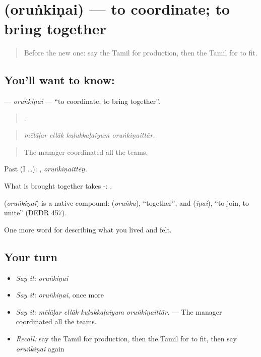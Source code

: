 \section[\texorpdfstring{\ta{ஒருங்கிணை} (oruṅkiṇai)}{ஒருங்கிணை (oruṅkiṇai)}]{ (oruṅkiṇai) — to coordinate; to bring together}

\label{lesson:TA-C510-orunkinai}



\begin{quote}
Before the new one: say the Tamil for production, then the Tamil for to fit.
\end{quote}

\subsection*{You'll want to know: }
\textbf{} — \emph{oruṅkiṇai} — \textquotedblleft{}to coordinate; to bring together\textquotedblright{}.

\begin{quote}
   .
\end{quote}

\begin{quote}
\emph{mēlāḷar ellāk kuḻukkaḷaiyum oruṅkiṇaittār.}
\end{quote}

\begin{quote}
The manager coordinated all the teams.
\end{quote}

Past (I …): , \emph{oruṅkiṇaittēṉ}.

What is brought together takes -:  .

\begin{cousinweb}
\textbf{} (\emph{oruṅkiṇai}) is a native compound:  (\emph{oruṅku}), \textquotedblleft{}together\textquotedblright{}, and  (\emph{iṇai}), \textquotedblleft{}to join, to unite\textquotedblright{} (DEDR 457).
\end{cousinweb}

\begin{grammarlens}[title={What you've built}]
One more word for describing what you lived and felt.
\end{grammarlens}

\subsection*{Your turn}
\begin{itemize}
\raggedright
  \item \emph{Say it:} \emph{oruṅkiṇai}
  \item \emph{Say it:} \emph{oruṅkiṇai}, once more
  \item \emph{Say it:} \emph{mēlāḷar ellāk kuḻukkaḷaiyum oruṅkiṇaittār.} — The manager coordinated all the teams.
  \item \emph{Recall:} say the Tamil for production, then the Tamil for to fit, then say \emph{oruṅkiṇai} again
\end{itemize}

